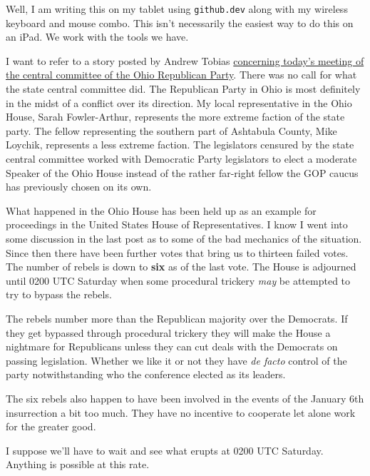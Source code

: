 Well, I am writing this on my tablet using \texttt{github.dev} along
with my wireless keyboard and mouse combo. This isn't necessarily the
easiest way to do this on an iPad. We work with the tools we have.

I want to refer to a story posted by Andrew Tobias
\href{https://www.cleveland.com/news/2023/01/ohio-republican-party-passes-resolution-condemning-22-gop-lawmakers-over-bipartisan-ohio-house-speaker-vote.html}{concerning
today's meeting of the central committee of the Ohio Republican Party}.
There was no call for what the state central committee did. The
Republican Party in Ohio is most definitely in the midst of a conflict
over its direction. My local representative in the Ohio House, Sarah
Fowler-Arthur, represents the more extreme faction of the state party.
The fellow representing the southern part of Ashtabula County, Mike
Loychik, represents a less extreme faction. The legislators censured by
the state central committee worked with Democratic Party legislators to
elect a moderate Speaker of the Ohio House instead of the rather
far-right fellow the GOP caucus has previously chosen on its own.

What happened in the Ohio House has been held up as an example for
proceedings in the United States House of Representatives. I know I went
into some discussion in the last post as to some of the bad mechanics of
the situation. Since then there have been further votes that bring us to
thirteen failed votes. The number of rebels is down to \textbf{six} as
of the last vote. The House is adjourned until 0200 UTC Saturday when
some procedural trickery \emph{may} be attempted to try to bypass the
rebels.

The rebels number more than the Republican majority over the Democrats.
If they get bypassed through procedural trickery they will make the
House a nightmare for Republicans unless they can cut deals with the
Democrats on passing legislation. Whether we like it or not they have
\emph{de facto} control of the party notwithstanding who the conference
elected as its leaders.

The six rebels also happen to have been involved in the events of the
January 6th insurrection a bit too much. They have no incentive to
cooperate let alone work for the greater good.

I suppose we'll have to wait and see what erupts at 0200 UTC Saturday.
Anything is possible at this rate.
